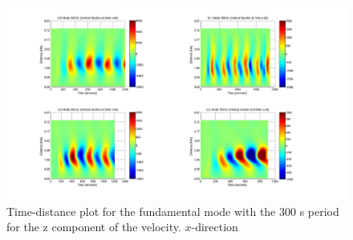 \documentclass[preprint,authoryear,12pt]{elsarticle}
\begin{document}

\begin{figure}[h]
\includegraphics[scale=0.8]{imrescale/dt_300_vert_x.jpg}
\caption{Time-distance plot for the fundamental mode with the 300 s period for the z component of the velocity. $x$-direction }
\label{Fig7}
\end{figure}






\end{document}
